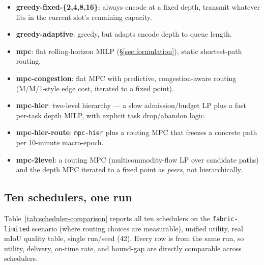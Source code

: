 \begin{itemize}
\item \textbf{greedy-fixed-\{2,4,8,16\}}: always encode at a fixed depth,
  transmit whatever fits in the current slot's remaining capacity.
\item \textbf{greedy-adaptive}: greedy, but adapts encode depth to queue
  length.
\item \textbf{mpc}: flat rolling-horizon MILP (\S\ref{sec:formulation}),
  static shortest-path routing.
\item \textbf{mpc-congestion}: flat MPC with predictive, congestion-aware
  routing (M/M/1-style edge cost, iterated to a fixed point).
\item \textbf{mpc-hier}: two-level hierarchy —
  a slow admission/budget LP plus a fast per-task depth MILP, with explicit
  task drop/abandon logic.
\item \textbf{mpc-hier-route}: \texttt{mpc-hier} plus a routing MPC that
  freezes a concrete path per 10-minute macro-epoch.
\item \textbf{mpc-2level}: a routing MPC (multicommodity-flow LP over
  candidate paths) and the depth MPC iterated to a fixed point as
  \emph{peers}, not hierarchically.
\end{itemize}


\subsection{Ten schedulers, one run}

Table~\ref{tab:scheduler-comparison} reports all ten schedulers on the
\texttt{fabric-limited} scenario (where routing choices are measurable),
unified utility, real mIoU quality table, single run/seed (42). Every row is
from the same run, so utility, delivery, on-time rate, and bound-gap are
directly comparable across schedulers.

